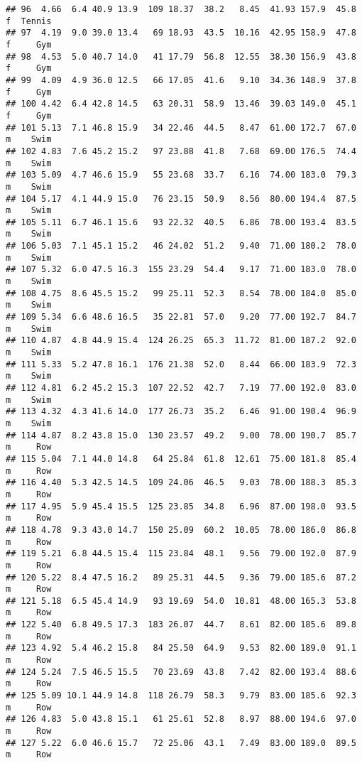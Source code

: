 \documentclass[
]{article}
\begin{document}
\begin{verbatim}
## 96  4.66  6.4 40.9 13.9  109 18.37  38.2   8.45  41.93 157.9  45.8   f  Tennis
## 97  4.19  9.0 39.0 13.4   69 18.93  43.5  10.16  42.95 158.9  47.8   f     Gym
## 98  4.53  5.0 40.7 14.0   41 17.79  56.8  12.55  38.30 156.9  43.8   f     Gym
## 99  4.09  4.9 36.0 12.5   66 17.05  41.6   9.10  34.36 148.9  37.8   f     Gym
## 100 4.42  6.4 42.8 14.5   63 20.31  58.9  13.46  39.03 149.0  45.1   f     Gym
## 101 5.13  7.1 46.8 15.9   34 22.46  44.5   8.47  61.00 172.7  67.0   m    Swim
## 102 4.83  7.6 45.2 15.2   97 23.88  41.8   7.68  69.00 176.5  74.4   m    Swim
## 103 5.09  4.7 46.6 15.9   55 23.68  33.7   6.16  74.00 183.0  79.3   m    Swim
## 104 5.17  4.1 44.9 15.0   76 23.15  50.9   8.56  80.00 194.4  87.5   m    Swim
## 105 5.11  6.7 46.1 15.6   93 22.32  40.5   6.86  78.00 193.4  83.5   m    Swim
## 106 5.03  7.1 45.1 15.2   46 24.02  51.2   9.40  71.00 180.2  78.0   m    Swim
## 107 5.32  6.0 47.5 16.3  155 23.29  54.4   9.17  71.00 183.0  78.0   m    Swim
## 108 4.75  8.6 45.5 15.2   99 25.11  52.3   8.54  78.00 184.0  85.0   m    Swim
## 109 5.34  6.6 48.6 16.5   35 22.81  57.0   9.20  77.00 192.7  84.7   m    Swim
## 110 4.87  4.8 44.9 15.4  124 26.25  65.3  11.72  81.00 187.2  92.0   m    Swim
## 111 5.33  5.2 47.8 16.1  176 21.38  52.0   8.44  66.00 183.9  72.3   m    Swim
## 112 4.81  6.2 45.2 15.3  107 22.52  42.7   7.19  77.00 192.0  83.0   m    Swim
## 113 4.32  4.3 41.6 14.0  177 26.73  35.2   6.46  91.00 190.4  96.9   m    Swim
## 114 4.87  8.2 43.8 15.0  130 23.57  49.2   9.00  78.00 190.7  85.7   m     Row
## 115 5.04  7.1 44.0 14.8   64 25.84  61.8  12.61  75.00 181.8  85.4   m     Row
## 116 4.40  5.3 42.5 14.5  109 24.06  46.5   9.03  78.00 188.3  85.3   m     Row
## 117 4.95  5.9 45.4 15.5  125 23.85  34.8   6.96  87.00 198.0  93.5   m     Row
## 118 4.78  9.3 43.0 14.7  150 25.09  60.2  10.05  78.00 186.0  86.8   m     Row
## 119 5.21  6.8 44.5 15.4  115 23.84  48.1   9.56  79.00 192.0  87.9   m     Row
## 120 5.22  8.4 47.5 16.2   89 25.31  44.5   9.36  79.00 185.6  87.2   m     Row
## 121 5.18  6.5 45.4 14.9   93 19.69  54.0  10.81  48.00 165.3  53.8   m     Row
## 122 5.40  6.8 49.5 17.3  183 26.07  44.7   8.61  82.00 185.6  89.8   m     Row
## 123 4.92  5.4 46.2 15.8   84 25.50  64.9   9.53  82.00 189.0  91.1   m     Row
## 124 5.24  7.5 46.5 15.5   70 23.69  43.8   7.42  82.00 193.4  88.6   m     Row
## 125 5.09 10.1 44.9 14.8  118 26.79  58.3   9.79  83.00 185.6  92.3   m     Row
## 126 4.83  5.0 43.8 15.1   61 25.61  52.8   8.97  88.00 194.6  97.0   m     Row
## 127 5.22  6.0 46.6 15.7   72 25.06  43.1   7.49  83.00 189.0  89.5   m     Row

\end{verbatim}
\end{document}
